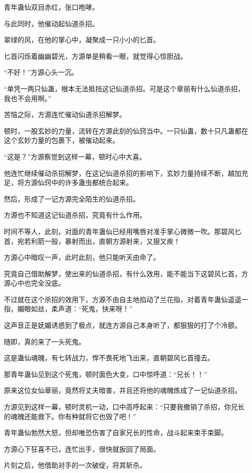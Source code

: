 \begin{this_body}
青年蛊仙双目赤红，张口咆哮。

与此同时，他催动起仙道杀招。

翠绿的风，在他的掌心中，凝聚成一只小小的匕首。

匕首闪烁着幽幽碧光，方源单是稍看一眼，就觉得心惊胆战。

“不好！”方源心头一沉。

“单凭一两只仙蛊，根本无法抵挡这记仙道杀招。可是这个章丽有什么仙道杀招，我也不会用啊。”

苦恼之际，方源连忙催动仙道杀招解梦。

顿时，一股玄妙的力量，流转在方源此刻的仙窍当中。一只仙蛊，数十只凡蛊都在这个玄妙力量的包裹下，被催动起来。

“这是？”方源察觉到这样一幕，顿时心中大喜。

他连忙继续催动杀招解梦，在这记仙道杀招的影响下，玄妙力量持续不断，越加充足，将方源仙窍中的许多蛊虫都统合起来。

然后，形成了一记方源完全陌生的仙道杀招。

方源也不知道这记仙道杀招，究竟有什么作用。

时间不等人，此刻，对面的青年蛊仙已经用嘴唇对准手掌心微微一吹。那碧风匕首，宛若利箭一般，暴射而出，直朝方源射来，又狠又疾！

方源心中暗叹一声，此时此刻，他只能听天由命了。

究竟自己借助解梦，使出来的仙道杀招，有什么效用，能不能当下这碧风匕首，方源心中也完全没底。

不过就在这个杀招的效用下，方源不由自主地掐动了兰花指，对着青年蛊仙遥遥一指，媚眼如丝，柔声道：“死鬼，快来呀！”

这声音正是妩媚诱惑到了极点，就连方源自己本身听了，都狠狠的打了个冷颤。

随即，真的来了一头死鬼。

这是蛊仙魂魄，有七转战力，悍不畏死地飞出来，直朝碧风匕首撞去。

那青年蛊仙见到这个死鬼，顿时面色大变，口中惊呼道：“兄长！！”

原来这位女仙章丽，竟然将丈夫暗害，并且还将他的魂魄炼成了一记仙道杀招。

方源见到这样一幕，顿时灵机一动，口中高呼起来：“只要我撤销了杀招，你兄长的魂魄还能救下。你有种就将它也毁了吧！”

青年蛊仙勃然大怒，但却唯恐伤害了自家兄长的性命，战斗起来束手束脚。

方源心下狂喜不已，连忙出手，很快就扳回了局面。

片刻之后，他借助对手的一次破绽，将其斩杀。


\end{this_body}
